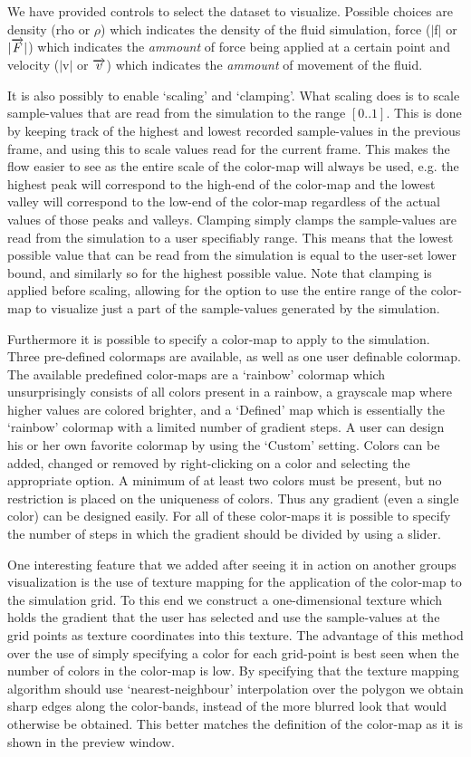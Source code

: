 \documentclass[a4paper,11pt,twoside]{report}
\begin{document}
		We have provided controls to select the dataset to visualize. Possible choices are density (rho or $\rho$) which indicates the density of the fluid simulation, force ($|$f$|$ or $|\overrightarrow{F}|$) which indicates the \emph{ammount} of force being applied at a certain point and velocity ($|$v$|$ or $\overrightarrow{v}$) which indicates the \emph{ammount} of movement of the fluid.

		It is also possibly to enable `scaling' and `clamping'. What scaling does is to scale sample-values that are read from the simulation to the range $[0..1]$. This is done by keeping track of the highest and lowest recorded sample-values in the previous frame, and using this to scale values read for the current frame. This makes the flow easier to see as the entire scale of the color-map will always be used, e.g. the highest peak will correspond to the high-end of the color-map and the lowest valley will correspond to the low-end of the color-map regardless of the actual values of those peaks and valleys.
		Clamping simply clamps the sample-values are read from the simulation to a user specifiably range. This means that the lowest possible value that can be read from the simulation is equal to the user-set lower bound, and similarly so for the highest possible value.
		Note that clamping is applied before scaling, allowing for the option to use the entire range of the color-map to visualize just a part of the sample-values generated by the simulation.

		Furthermore it is possible to specify a color-map to apply to the simulation. Three pre-defined colormaps are available, as well as one user definable colormap. The available predefined color-maps are a `rainbow' colormap which unsurprisingly consists of all colors present in a rainbow, a grayscale map where higher values are colored brighter, and a `Defined' map which is essentially the `rainbow' colormap with a limited number of gradient steps. A user can design his or her own favorite colormap by using the `Custom' setting. Colors can be added, changed or removed by right-clicking on a color and selecting the appropriate option. A minimum of at least two colors must be present, but no restriction is placed on the uniqueness of colors. Thus any gradient (even a single color) can be designed easily. For all of these color-maps it is possible to specify the number of steps in which the gradient should be divided by using a slider.

		One interesting feature that we added after seeing it in action on another groups visualization is the use of texture mapping for the application of the color-map to the simulation grid. To this end we construct a one-dimensional texture which holds the gradient that the user has selected and use the sample-values at the grid points as texture coordinates into this texture. The advantage of this method over the use of simply specifying a color for each grid-point is best seen when the number of colors in the color-map is low. By specifying that the texture mapping algorithm should use `nearest-neighbour' interpolation over the polygon we obtain sharp edges along the color-bands, instead of the more blurred look that would otherwise be obtained. This better matches the definition of the color-map as it is shown in the preview window.
\end{document}
